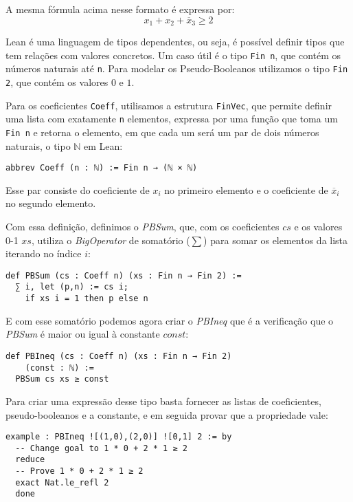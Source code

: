 \documentclass[conference]{IEEEtran}
\begin{document}
A mesma fórmula acima nesse formato é expressa por:
\begin{equation}
    x_1 + x_2 + \overline x_3 \ge 2
\end{equation}

Lean é uma linguagem de tipos dependentes, ou seja, é possível definir tipos que tem relações com valores concretos.
Um caso útil é o tipo \texttt{Fin n}, que contém os números naturais até \texttt{n}.
Para modelar os Pseudo-Booleanos utilizamos o tipo \texttt{Fin 2}, que contém os valores $0$ e $1$.

Para os coeficientes \texttt{Coeff}, utilisamos a estrutura \texttt{FinVec},
que permite definir uma lista com exatamente \texttt{n} elementos,
expressa por uma função que toma um \texttt{Fin n} e retorna o elemento,
em que cada um será um par de dois números naturais, o tipo $\mathbb{N}$ em Lean:
\begin{verbatim}
abbrev Coeff (n : ℕ) := Fin n → (ℕ × ℕ)
\end{verbatim}

Esse par consiste do coeficiente de $x_i$ no primeiro elemento e
o coeficiente de $\overline x_i$ no segundo elemento.

Com essa definição, definimos o \textit{PBSum}, que, com os coeficientes $cs$ e os valores 0-1 $xs$,
utiliza o \textit{BigOperator} de somatório ($\sum$) para somar os elementos da lista iterando no índice $i$:
\begin{verbatim}
def PBSum (cs : Coeff n) (xs : Fin n → Fin 2) :=
  ∑ i, let (p,n) := cs i;
    if xs i = 1 then p else n
\end{verbatim}

E com esse somatório podemos agora criar o \textit{PBIneq} que é a verificação que o \textit{PBSum}
é maior ou igual à constante $const$:
\begin{verbatim}
def PBIneq (cs : Coeff n) (xs : Fin n → Fin 2)
    (const : ℕ) :=
  PBSum cs xs ≥ const
\end{verbatim}

Para criar uma expressão desse tipo basta fornecer as listas de coeficientes, pseudo-booleanos e a constante,
e em seguida provar que a propriedade vale:
\\
\begin{verbatim}
example : PBIneq ![(1,0),(2,0)] ![0,1] 2 := by
  -- Change goal to 1 * 0 + 2 * 1 ≥ 2
  reduce               
  -- Prove 1 * 0 + 2 * 1 ≥ 2
  exact Nat.le_refl 2  
  done
\end{verbatim}
\end{document}
